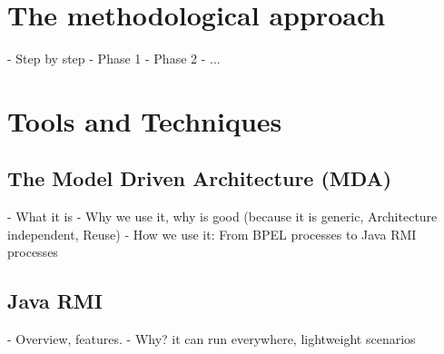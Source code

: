 
\section{The methodological approach}
- Step by step \nl
- Phase 1 \nl
- Phase 2 \nl 
- ... \nl





\section{Tools and Techniques}


\subsection{The Model Driven Architecture (MDA)}
- What it is \nl
- Why we use it, why is good (because it is generic, Architecture independent, Reuse)  \nl
- How we use it: From BPEL processes to Java RMI processes \nl
\subsection{Java RMI}
- Overview, features.
- Why? it can run everywhere, lightweight scenarios  \nl

